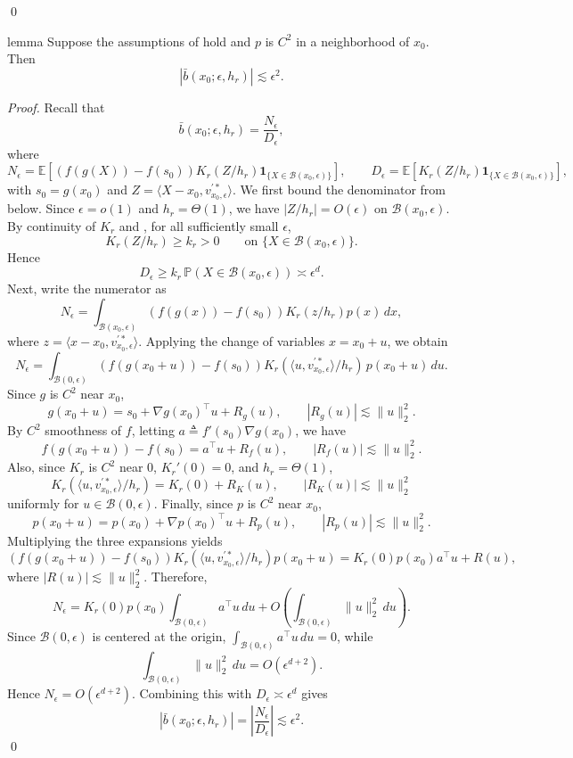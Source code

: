 \documentclass[11pt]{article}
\begin{document}
\begin{appendices}
\qed{}


\begin{restatable}{lemma}{}\label{lemma: bias bound}
    Suppose the assumptions of  hold and $p$ is $C^2$ in a neighborhood of $x_0$. Then
    \[
        |\bar b(x_0;\epsilon,h_r)| \lesssim \epsilon^2.
    \]
\end{restatable}
\noindent \textit{Proof.}
Recall that
\[
\bar b(x_0;\epsilon,h_r)
=
\frac{N_\epsilon}{D_\epsilon},
\]
where
\[
N_\epsilon
=
\mathbb E\!\left[(f(g(X))-f(s_0))K_r(Z/h_r)\mathbf 1_{\{X\in \mathcal B(x_0,\epsilon)\}}\right],
\qquad
D_\epsilon
=
\mathbb E\!\left[K_r(Z/h_r)\mathbf 1_{\{X\in \mathcal B(x_0,\epsilon)\}}\right],
\]
with \(s_0=g(x_0)\) and \(Z=\langle X-x_0,v_{x_0,\epsilon}^{\prime *}\rangle\). We first bound the denominator from below. Since \(\epsilon=o(1)\) and \(h_r=\Theta(1)\), we have \(|Z/h_r|=O(\epsilon)\) on \(\mathcal B(x_0,\epsilon)\). By continuity of \(K_r\) and , for all sufficiently small \(\epsilon\),
\[
K_r(Z/h_r)\ge k_r>0
\qquad\text{on }\{X\in \mathcal B(x_0,\epsilon)\}.
\]
Hence
\[
D_\epsilon
\ge
k_r\,\mathbb P(X\in \mathcal B(x_0,\epsilon))
\asymp \epsilon^d.
\]
Next, write the numerator as
\[
N_\epsilon
=
\int_{\mathcal B(x_0,\epsilon)}
(f(g(x))-f(s_0))K_r(z/h_r)p(x)\,dx,
\]
where \(z=\langle x-x_0,v_{x_0,\epsilon}^{\prime *}\rangle\). Applying the change of variables \(x=x_0+u\), we obtain
\[
N_\epsilon
=
\int_{\mathcal B(0,\epsilon)}
(f(g(x_0+u))-f(s_0))
K_r(\langle u,v_{x_0,\epsilon}^{\prime *}\rangle/h_r)\,
p(x_0+u)\,du.
\]
Since \(g\) is \(C^2\) near \(x_0\),
\[
g(x_0+u)
=
s_0 + \nabla g(x_0)^\top u + R_g(u),
\qquad
|R_g(u)| \lesssim \|u\|_2^2.
\]
By $C^2$ smoothness of \(f\), letting $a \triangleq f'(s_0)\nabla g(x_0)$, we have
\[
f(g(x_0+u)) - f(s_0) = a^\top u + R_f(u),
\qquad
|R_f(u)|\lesssim \|u\|_2^2.
\]
Also, since \(K_r\) is \(C^2\) near \(0\), \(K_r'(0)=0\), and \(h_r=\Theta(1)\),
\[
K_r(\langle u,v_{x_0,\epsilon}^{\prime *}\rangle/h_r)
=
K_r(0)+R_K(u),
\qquad
|R_K(u)| \lesssim \|u\|_2^2
\]
uniformly for \(u\in \mathcal B(0,\epsilon)\). Finally, since \(p\) is \(C^2\) near \(x_0\),
\[
p(x_0+u)=p(x_0)+\nabla p(x_0)^\top u + R_p(u),
\qquad
|R_p(u)| \lesssim \|u\|_2^2.
\]
Multiplying the three expansions yields
\[
(f(g(x_0+u))-f(s_0))
K_r(\langle u,v_{x_0,\epsilon}^{\prime *}\rangle/h_r)
p(x_0+u)
=
K_r(0)p(x_0)a^\top u + R(u),
\]
where $|R(u)| \lesssim \|u\|_2^2$. Therefore,
\[
N_\epsilon
=
K_r(0)p(x_0)\int_{\mathcal B(0,\epsilon)} a^\top u\,du
+
O\!\left(\int_{\mathcal B(0,\epsilon)} \|u\|_2^2\,du\right).
\]
Since \(\mathcal B(0,\epsilon)\) is centered at the origin, \(\int_{\mathcal B(0,\epsilon)} a^\top u\,du = 0\), while
\[
\int_{\mathcal B(0,\epsilon)}\|u\|_2^2\,du
=
O(\epsilon^{d+2}).
\]
Hence \(N_\epsilon=O(\epsilon^{d+2})\). Combining this with \(D_\epsilon\asymp\epsilon^d\) gives
\[
|\bar b(x_0;\epsilon,h_r)|
=
\left|\frac{N_\epsilon}{D_\epsilon}\right|
\lesssim
\epsilon^2.
\]
\qed{}


\end{appendices}
\end{document}
